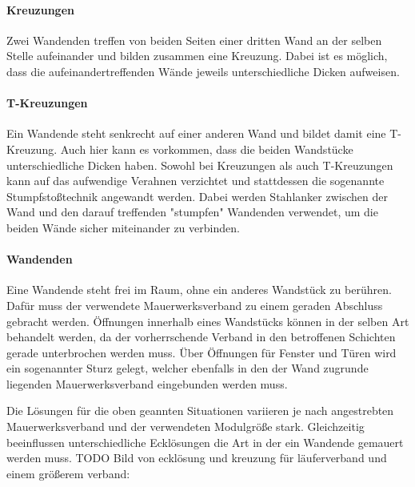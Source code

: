 \paragraph{Kreuzungen}
Zwei Wandenden treffen von beiden Seiten einer dritten Wand an der selben Stelle aufeinander und bilden zusammen eine Kreuzung.
Dabei ist es möglich, dass die aufeinandertreffenden Wände jeweils unterschiedliche Dicken aufweisen.
\paragraph{T-Kreuzungen}
Ein Wandende steht senkrecht auf einer anderen Wand und bildet damit eine T-Kreuzung.
Auch hier kann es vorkommen, dass die beiden Wandstücke unterschiedliche Dicken haben.
Sowohl bei Kreuzungen als auch T-Kreuzungen kann auf das aufwendige Verahnen verzichtet und stattdessen die sogenannte Stumpfstoßtechnik angewandt werden.
Dabei werden Stahlanker zwischen der Wand und den darauf treffenden "stumpfen" Wandenden verwendet, um die beiden Wände sicher miteinander zu verbinden.
\paragraph{Wandenden}
Eine Wandende steht frei im Raum, ohne ein anderes Wandstück zu berühren. 
Dafür muss der verwendete Mauerwerksverband zu einem geraden Abschluss gebracht werden.
Öffnungen innerhalb eines Wandstücks können in der selben Art behandelt werden, da der vorherrschende Verband in den betroffenen Schichten gerade unterbrochen werden muss.
Über Öffnungen für Fenster und Türen wird ein sogenannter Sturz gelegt, welcher ebenfalls in den der Wand zugrunde liegenden Mauerwerksverband eingebunden werden muss.

Die Lösungen für die oben geannten Situationen variieren je nach angestrebten Mauerwerksverband und der verwendeten Modulgröße stark. 
Gleichzeitig beeinflussen unterschiedliche Ecklösungen die Art in der ein Wandende gemauert werden muss.
TODO Bild von ecklösung und kreuzung für läuferverband und einem größerem verband:\label{basics:mauerwerk_eckloesung}

